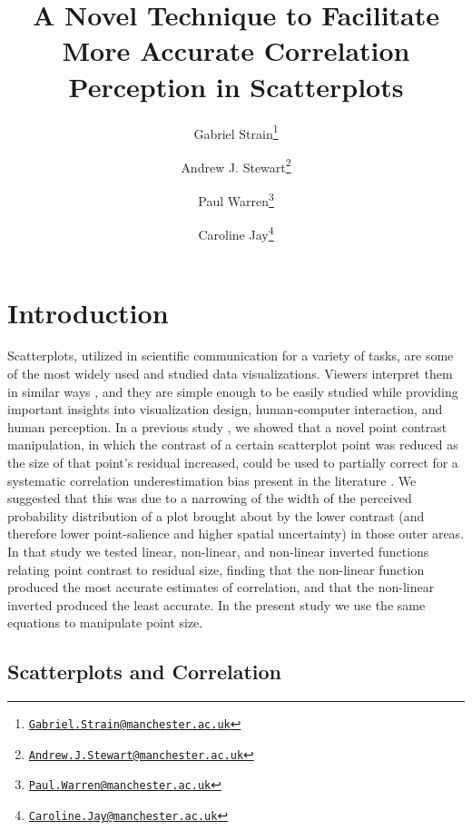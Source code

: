 \documentclass{vgtc}                          %
\title{A Novel Technique to Facilitate More Accurate Correlation Perception in Scatterplots}
\author{Gabriel Strain\thanks{\href{mailto:Gabriel.Strain@manchester.ac.uk}{\nolinkurl{Gabriel.Strain@manchester.ac.uk}}} %
\and Andrew J. Stewart\thanks{\href{mailto:Andrew.J.Stewart@manchester.ac.uk}{\nolinkurl{Andrew.J.Stewart@manchester.ac.uk}}} %
\and Paul Warren\thanks{\href{mailto:Paul.Warren@manchester.ac.uk}{\nolinkurl{Paul.Warren@manchester.ac.uk}}} %
\and Caroline Jay\thanks{\href{mailto:Caroline.Jay@manchester.ac.uk}{\nolinkurl{Caroline.Jay@manchester.ac.uk}}}} %
\affiliation{\scriptsize The University of Manchester}
\begin{document}

\firstsection{}

\maketitle

\hypertarget{introduction}{%
\section{Introduction}\label{introduction}}

Scatterplots, utilized in scientific communication for a variety of tasks,
are some of the most widely used and studied data visualizations. Viewers
interpret them in similar ways \cite{kay_heer_2015}, and they are simple
enough to be easily studied while providing important insights into visualization
design, human-computer interaction, and human perception. In a previous study \cite{strain_2023},
we showed that a novel point contrast manipulation, in which the contrast of a certain
scatterplot point was reduced as the size of that point's residual increased, could be
used to partially correct for a systematic correlation underestimation bias present in the
literature \cite{strahan_1978, bobko_1979, cleveland_1984, lane_1985, lauer_1989, 
collyer_1990, meyer_1992}. We suggested that this was due to a narrowing of the width
of the perceived probability distribution of a plot brought
about by the lower contrast (and therefore lower point-salience and higher spatial uncertainty) in those outer areas. In that study we tested linear, non-linear, and non-linear inverted functions relating
point contrast to residual size, finding that the non-linear function produced
the most accurate estimates of correlation, and that the non-linear inverted produced
the least accurate. In the present study we use the same equations to manipulate
point size.

\hypertarget{scatterplots-and-correlation}{%
\subsection{Scatterplots and Correlation}\label{scatterplots-and-correlation}}
\end{document}
